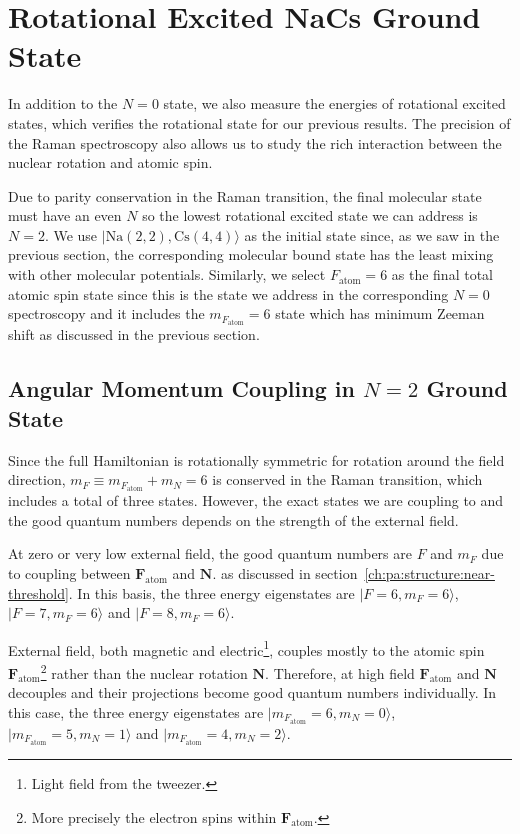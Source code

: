 \section{Rotational Excited NaCs Ground State}
\label{ch:raman-spectroscopy:n2}

In addition to the $N=0$ state, we also measure the energies of rotational excited states,
which verifies the rotational state for our previous results.
The precision of the Raman spectroscopy also allows us
to study the rich interaction between the nuclear rotation and atomic spin.

Due to parity conservation in the Raman transition,
the final molecular state must have an even $N$
so the lowest rotational excited state we can address is $N=2$.
We use $|\mathrm{Na(2, 2),Cs(4, 4)}\rangle$ as the initial state since,
as we saw in the previous section, the corresponding molecular bound state
has the least mixing with other molecular potentials.
Similarly, we select $F_{\mathrm{atom}}=6$ as the final total atomic spin state
since this is the state we address in the corresponding $N=0$ spectroscopy and
it includes the $m_{F_{\mathrm{atom}}}=6$ state which has minimum
Zeeman shift as discussed in the previous section.

\subsection{Angular Momentum Coupling in \texorpdfstring{$N=2$}{N=2} Ground State}
\label{ch:raman-spectroscopy:n2:angular-momentum}

Since the full Hamiltonian is rotationally symmetric for rotation around the field direction,
$m_F\equiv m_{F_{\mathrm{atom}}}+m_{N}=6$ is conserved in the Raman transition,
which includes a total of three states.
However, the exact states we are coupling to and the good quantum numbers depends on
the strength of the external field.

At zero or very low external field, the good quantum numbers are $F$ and $m_F$
due to coupling between $\mathbf{F}_{\mathrm{atom}}$ and $\mathbf{N}$.
as discussed in section~\ref{ch:pa:structure:near-threshold}.
In this basis, the three energy eigenstates are
$|F=6,m_F=6\rangle$, $|F=7,m_F=6\rangle$ and $|F=8,m_F=6\rangle$.

External field, both magnetic and electric\footnote{Light field from the tweezer.},
couples mostly to the atomic spin $\mathbf{F}_{\mathrm{atom}}$\footnote{
  More precisely the electron spins within $\mathbf{F}_{\mathrm{atom}}$.}
rather than the nuclear rotation $\mathbf{N}$.
Therefore, at high field $\mathbf{F}_{\mathrm{atom}}$ and $\mathbf{N}$
decouples and their projections become good quantum numbers individually.
In this case, the three energy eigenstates are
$|m_{F_\mathrm{atom}}=6,m_N=0\rangle$, $|m_{F_\mathrm{atom}}=5,m_N=1\rangle$ and
$|m_{F_\mathrm{atom}}=4,m_N=2\rangle$.

